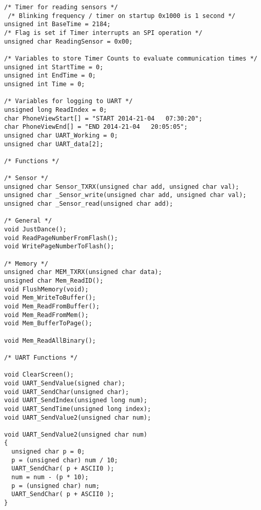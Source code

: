 \begin{lstlisting}[caption=main.h,label=Code1]
/* Timer for reading sensors */
 /* Blinking frequency / timer on startup 0x1000 is 1 second */
unsigned int BaseTime = 2184; 	  
/* Flag is set if Timer interrupts an SPI operation */
unsigned char ReadingSensor = 0x00; 

/* Variables to store Timer Counts to evaluate communication times */
unsigned int StartTime = 0;
unsigned int EndTime = 0;
unsigned int Time = 0;

/* Variables for logging to UART */
unsigned long ReadIndex = 0;
char PhoneViewStart[] = "START 2014-21-04   07:30:20";
char PhoneViewEnd[] = "END 2014-21-04   20:05:05";
unsigned char UART_Working = 0;
unsigned char UART_data[2];

/* Functions */

/* Sensor */
unsigned char Sensor_TXRX(unsigned char add, unsigned char val);
unsigned char _Sensor_write(unsigned char add, unsigned char val);
unsigned char _Sensor_read(unsigned char add);

/* General */
void JustDance();
void ReadPageNumberFromFlash();
void WritePageNumberToFlash();

/* Memory */
unsigned char MEM_TXRX(unsigned char data);
unsigned char Mem_ReadID();
void FlushMemory(void);
void Mem_WriteToBuffer();
void Mem_ReadFromBuffer();
void Mem_ReadFromMem();
void Mem_BufferToPage();

void Mem_ReadAllBinary();

/* UART Functions */

void ClearScreen();
void UART_SendValue(signed char);
void UART_SendChar(unsigned char);
void UART_SendIndex(unsigned long num);
void UART_SendTime(unsigned long index);
void UART_SendValue2(unsigned char num);

void UART_SendValue2(unsigned char num)
{
  unsigned char p = 0;
  p = (unsigned char) num / 10;
  UART_SendChar( p + ASCII0 );
  num = num - (p * 10);
  p = (unsigned char) num;
  UART_SendChar( p + ASCII0 );  
}
\end{lstlisting}
\pagebreak

